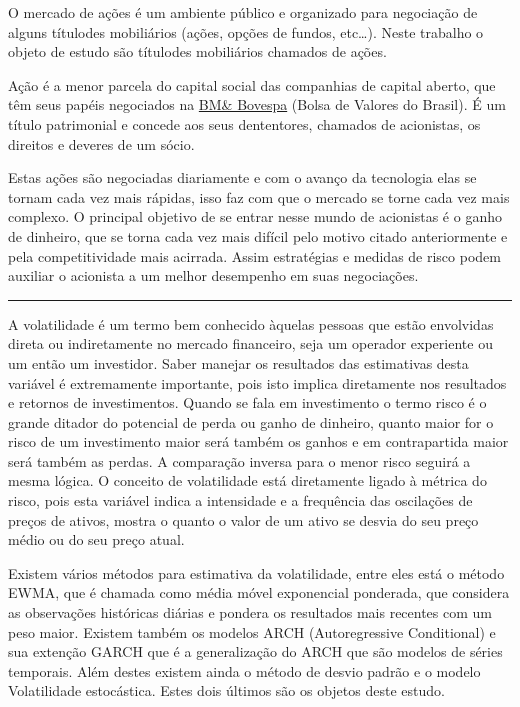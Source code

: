 \documentclass[]{article}
\begin{document}
O mercado de ações é um ambiente público e organizado para negociação de
alguns títulodes mobiliários (ações, opções de fundos, etc\ldots{}).
Neste trabalho o objeto de estudo são títulodes mobiliários chamados de
ações.

Ação é a menor parcela do capital social das companhias de capital
aberto, que têm seus papéis negociados na \href{}{BM\& Bovespa} (Bolsa
de Valores do Brasil). É um título patrimonial e concede aos seus
dententores, chamados de acionistas, os direitos e deveres de um sócio.

Estas ações são negociadas diariamente e com o avanço da tecnologia elas
se tornam cada vez mais rápidas, isso faz com que o mercado se torne
cada vez mais complexo. O principal objetivo de se entrar nesse mundo de
acionistas é o ganho de dinheiro, que se torna cada vez mais difícil
pelo motivo citado anteriormente e pela competitividade mais acirrada.
Assim estratégias e medidas de risco podem auxiliar o acionista a um
melhor desempenho em suas negociações.

\begin{center}\rule{0.5\linewidth}{\linethickness}\end{center}

A volatilidade é um termo bem conhecido àquelas pessoas que estão
envolvidas direta ou indiretamente no mercado financeiro, seja um
operador experiente ou um então um investidor. Saber manejar os
resultados das estimativas desta variável é extremamente importante,
pois isto implica diretamente nos resultados e retornos de
investimentos. Quando se fala em investimento o termo risco é o grande
ditador do potencial de perda ou ganho de dinheiro, quanto maior for o
risco de um investimento maior será também os ganhos e em contrapartida
maior será também as perdas. A comparação inversa para o menor risco
seguirá a mesma lógica. O conceito de volatilidade está diretamente
ligado à métrica do risco, pois esta variável indica a intensidade e a
frequência das oscilações de preços de ativos, mostra o quanto o valor
de um ativo se desvia do seu preço médio ou do seu preço atual.

Existem vários métodos para estimativa da volatilidade, entre eles está
o método EWMA, que é chamada como média móvel exponencial ponderada, que
considera as observações históricas diárias e pondera os resultados mais
recentes com um peso maior. Existem também os modelos ARCH
(Autoregressive Conditional) e sua extenção GARCH que é a generalização
do ARCH que são modelos de séries temporais. Além destes existem ainda o
método de desvio padrão e o modelo Volatilidade estocástica. Estes dois
últimos são os objetos deste estudo.
\end{document}
